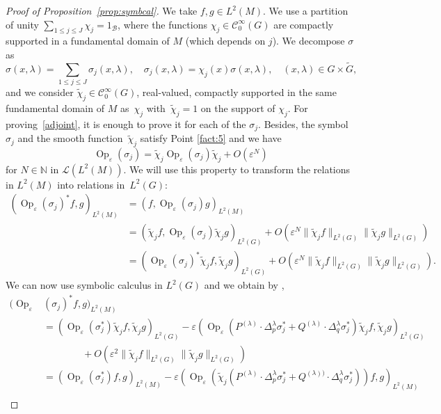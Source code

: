 \documentclass[JEP,XML,SOM,Unicode,published]{cedram}
\let\mathcal\mathscr
\DeclareMathOperator{\Op}{Op}
\theoremstyle{plain}
\theoremstyle{definition}
\let\eps\varepsilon
\def\N{{\mathbb N}}
\begin{document}
\begin{proof}[Proof of Proposition~\ref{prop:symbcal}]
We take $f,g\in L^2(M)$. We use a partition of unity
$\sum_{1\leq j\leq J} \chi_j= 1_{\mathcal B}$, where the functions $\chi_j\in \mathcal C^\infty_0(G)$ are compactly supported in a fundamental domain of $M$ (which depends on $j$). We decompose $\sigma$ as
\[
\sigma(x,\lambda)= \sum_{1\leq j\leq J}\sigma_j(x,\lambda),\quad \sigma_j(x,\lambda)= \chi_j(x) \sigma(x,\lambda),\quad (x,\lambda)\in G\times \widetilde G,
\]
and we consider $\widetilde \chi_j\in\mathcal C^\infty_0(G)$, real-valued, compactly supported in the same fundamental domain of $M$ as~$\chi_j$ with~$\widetilde \chi_j=1$ on the support of $\chi_j$. For proving~\eqref{adjoint}, it is enough to prove it for each of the $\sigma_j$. Besides, the symbol $\sigma_j$ and the smooth function~$\widetilde \chi_j$ satisfy Point \eqref{fact:5} and we have
\[
\Op_\eps(\sigma_j)= \widetilde \chi_j\Op_\eps (\sigma_j)\widetilde \chi_j +O(\eps^N)
\]
for $N\in\N$
in $\mathcal L (L^2(M))$. We will use this property to transform the relations in $L^2(M)$ into relations in~$L^2(G)$:
\begin{align*}
\left(\Op_\eps (\sigma_j)^* f,g\right)_{L^2(M)}&= \left(f, \Op_\eps (\sigma_j) g\right)_{L^2(M)}\\
&= \left(\widetilde \chi _j f, \Op_\eps (\sigma_j) \widetilde \chi_j g\right)_{L^2(G)}+ O(\eps^N \|\widetilde \chi_j f\|_{L^2(G)} \|\widetilde\chi_j g\|_{L^2(G)})\\
&= \left(\Op_\eps (\sigma_j)^* \widetilde \chi_j f,\widetilde \chi_j g\right)_{L^2(G)} + O(\eps^N \|\widetilde\chi_j f\|_{L^2(G)} \|\widetilde\chi_j g\|_{L^2(G)}).
\end{align*}
We can now use symbolic calculus in $L^2(G)$ and we obtain by
\cite[Prop.\,3.6]{FF1},
\begin{align*}
\bigl(\Op_\eps &(\sigma_j)^* f,g\bigr)_{L^2(M)}\\
&= \left(\Op_\eps (\sigma_j^*) \widetilde \chi_j f,\widetilde \chi_j g\right)_{L^2(G)}
-{\eps} (\Op_\eps(P^{(\lambda)}\cdot \Delta^\lambda_p \sigma_j^*+Q^{(\lambda)}\cdot \Delta^\lambda_q \sigma_j^*)\widetilde \chi_j f,\widetilde \chi_j g)_{L^2(G)} \\
&\qquad \qquad+O(\eps^2 \|\widetilde\chi_j f\|_{L^2(G)} \|\widetilde \chi_j g\|_{L^2(G)})\\
&= \left(\Op_\eps (\sigma_j^*) f, g\right)_{L^2(M)} -{\eps} (\Op_\eps(\widetilde \chi_j (P^{(\lambda)}\cdot \Delta^\lambda_p \sigma_j^*+Q^{(\lambda))}\cdot \Delta^\lambda_q \sigma_j^*)) f,g)_{L^2(M)} \\

\end{align*}
\end{proof}
\end{document}
